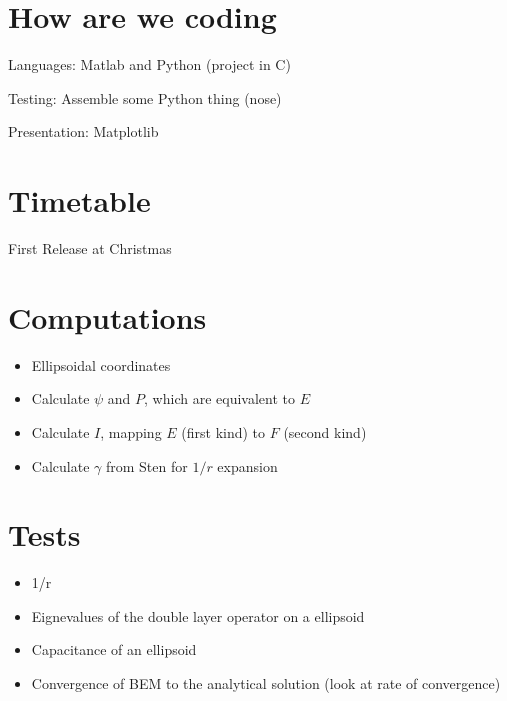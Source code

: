 \section{How are we coding}

  Languages: Matlab and Python (project in C)

  Testing: Assemble some Python thing (nose)

  Presentation: Matplotlib

\section{Timetable}

  First Release at Christmas

\section{Computations}

\begin{itemize}
  \item Ellipsoidal coordinates

  \item Calculate $\psi$ and $P$, which are equivalent to $E$

  \item Calculate $I$, mapping $E$ (first kind) to $F$ (second kind)

  \item Calculate $\gamma$ from Sten for $1/r$ expansion
\end{itemize}

\section{Tests}

\begin{itemize}
  \item 1/r

  \item Eignevalues of the double layer operator on a ellipsoid

  \item Capacitance of an ellipsoid

  \item Convergence of BEM to the analytical solution (look at rate of convergence)
\end{itemize}
